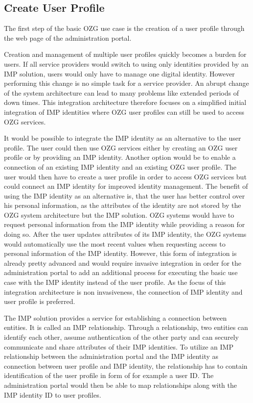 
\subsection{Create User Profile}

The first step of the basic OZG use case is the creation of a user profile through the web page of the administration portal.

Creation and management of multiple user profiles quickly becomes a burden for users. If all service providers would switch to using only identities provided by an IMP solution, users would only have to manage one digital identity. However performing this change is no simple task for a service provider. An abrupt change of the system architecture can lead to many problems like extended periods of down times. This integration architecture therefore focuses on a simplified initial integration of IMP identities where OZG user profiles can still be used to access OZG services.

It would be possible to integrate the IMP identity as an alternative to the user profile. The user could then use OZG services either by creating an OZG user profile or by providing an IMP identity. Another option would be to enable a connection of an existing IMP identity and an existing OZG user profile. The user would then have to create a user profile in order to access OZG services but could connect an IMP identity for improved identity management. The benefit of using the IMP identity as an alternative is, that the user has better control over his personal information, as the attributes of the identity are not stored by the OZG system architecture but the IMP solution. OZG systems would have to request personal information from the IMP identity while providing a reason for doing so. After the user updates attributes of its IMP identity, the OZG systems would automatically use the most recent values when requesting access to personal information of the IMP identity. However, this form of integration is already pretty advanced and would require invasive integration in order for the administration portal to add an additional process for executing the basic use case with the IMP identity instead of the user profile. As the focus of this integration architecture is non invasiveness, the connection of IMP identity and user profile is preferred.

The IMP solution provides a service for establishing a connection between entities. It is called an IMP relationship. Through a relationship, two entities can identify each other, assume authentication of the other party and can securely communicate and share attributes of their IMP identities. To utilize an IMP relationship between the administration portal and the IMP identity as connection between user profile and IMP identity, the relationship has to contain identification of the user profile in form of for example a user ID. The administration portal would then be able to map relationships along with the IMP identity ID to user profiles.

